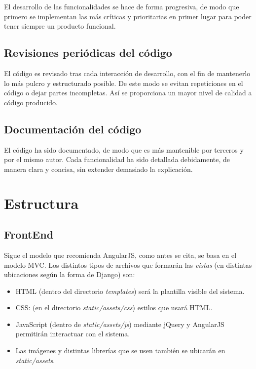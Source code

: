 El desarrollo de las funcionalidades se hace de forma progresiva, de modo que primero se implementan las más críticas y prioritarias en primer lugar para poder tener siempre un producto funcional.

\bigskip
\subsection{Revisiones periódicas del código}
\bigskip

El código es revisado tras cada interacción de desarrollo, con el fin de mantenerlo lo más pulcro y estructurado posible. De este modo se evitan repeticiones en el código o dejar partes incompletas. Así se proporciona un mayor nivel de calidad a código producido.

\bigskip
\subsection{Documentación del código}
\bigskip

El código ha sido documentado, de modo que es más mantenible por terceros y por el mismo autor. Cada funcionalidad ha sido detallada debidamente, de manera clara y concisa, sin extender demasiado la explicación.




\newpage
\section{Estructura}

\bigskip
\subsection{FrontEnd}
\bigskip

Sigue el modelo que recomienda AngularJS, como antes se cita, se basa en el modelo MVC. Los distintos tipos de archivos que formarán las \textit{vistas} (en distintas ubicaciones según la forma de Django) son:

\begin{itemize}
	\item HTML (dentro del directorio \textit{templates}) será la plantilla visible del sistema.
	\item CSS: (en el directorio \textit{static/assets/css}) estilos que usará HTML.
	\item JavaScript (dentro de \textit{static/assets/js}) mediante jQuery y AngularJS permitirán interactuar con el sistema.
	\item Las imágenes y distintas librerías que se usen también se ubicarán en \textit{static/assets}.
\end{itemize}


